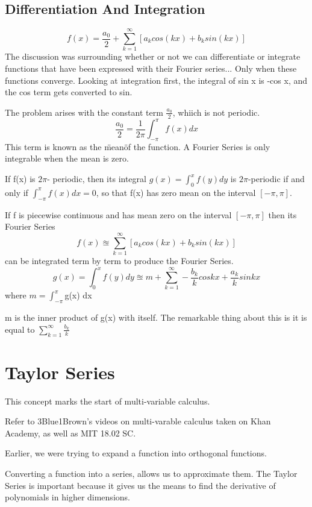 \documentclass[twoside]{report}
\begin{document}
\section{Differentiation And Integration} %
\[
   f(x) = \frac{a_0}{2} + \sum_{k=1}^{\infty} [a_k cos(kx) + b_k sin(kx)]
\]
The discussion was surrounding whether or not we can differentiate or integrate functions that have been expressed with their Fourier series... Only when these functions converge. 
Looking at integration first, the integral of sin x is -cos x, and the cos term gets converted to sin. 

The problem arises with the constant term $\frac{a_0}{2}$, whiich is not periodic.
\[
   \frac{a_0}{2} = \frac{1}{2\pi} \int_{-\pi}^{\pi} f(x) dx
\]
This term is known as the \"mean\" of the function. A Fourier Series is only integrable when the mean is zero.
\begin{lemma}
   If f(x)  is $2\pi$- periodic, then its integral $g(x) = \int_0^{x} f(y) dy$ is $2\pi$-periodic if and only if $\int_{-\pi}^\pi f(x) dx = 0$, so that f(x) has zero mean on the interval $[-\pi,\pi]$.
\end{lemma}
\begin{theorem}
   If f is piecewise continuous and has mean zero on the interval $[-\pi,\pi]$ then its Fourier Series  
	\begin{displaymath}
	   f(x) \approxeq \sum_{k=1}^{\infty} [a_k cos(kx) + b_k sin(kx)]
	\end{displaymath}
	can be integrated term by term to produce the Fourier Series. 
	\[
	   g(x) = \int_0^{x} f(y) dy \approxeq m + \sum_{k=1}^{\infty} - \frac{b_k}{k} cos kx + \frac{a_k}{k} sin kx
	\]
	where $m = \int_{-\pi}^{\pi}$g(x) dx
\end{theorem}
\begin{note}
   m is the inner product of g(x) with itself. The remarkable thing about this is it is equal to $\sum_{k=1}^{\infty} \frac{b_k}{k}$
\end{note}
\chapter{Taylor Series}
This concept marks the start of multi-variable calculus. 

Refer to 3Blue1Brown's videos on multi-varable calculus taken on Khan Academy, as well as MIT 18.02 SC. 

Earlier, we were trying to expand a function into orthogonal functions. 

Converting a function into a series, allows us to approximate them. The Taylor Series is important because it gives us the means to find the derivative of polynomials in higher dimensions.
\end{document}
